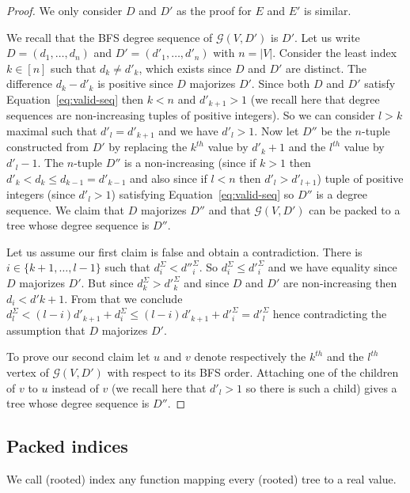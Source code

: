 \documentclass[11 pt]{modarticle}
\newcommand{\size}[1]{|#1|}
\newcommand{\greedy}[2]{\mathcal{G}(#1,#2)}
\begin{document}
\begin{proof}
We only consider $D$ and $D'$ as the proof for $E$ and $E'$ is similar.

We recall that the BFS degree sequence of $\greedy{V}{D'}$ is $D'$. Let us write $D = (d_1, \dots, d_n)$ and $D' = (d'_1, \dots, d'_n)$ with $n = \size{V}$. Consider the least index $k \in [n]$ such that $d_k \neq d'_k$, which exists since $D$ and $D'$ are distinct. The difference $d_k - d'_k$ is positive since $D$ majorizes $D'$. Since both $D$ and $D'$ satisfy Equation~\eqref{eq:valid-seq} then $k < n$ and $d'_{k+1} > 1$ (we recall here that degree sequences are non-increasing tuples of positive integers). So we can consider $l > k$ maximal such that $d'_l = d'_{k+1}$ and we have $d'_l > 1$. Now let $D''$ be the $n$-tuple constructed from $D'$ by replacing the $k^{th}$ value by $d'_k+1$ and the $l^{th}$ value by $d'_l-1$. The $n$-tuple $D''$ is a non-increasing (since if $k > 1$ then $d'_k < d_k \leq d_{k-1} = d'_{k-1}$ and also since if $l < n$ then $d'_l > d'_{l+1}$) tuple of positive integers (since $d'_l > 1$) satisfying Equation~\eqref{eq:valid-seq} so $D''$ is a degree sequence. We claim that $D$ majorizes $D''$ and that $\greedy{V}{D'}$ can be packed to a tree whose degree sequence is $D''$.

Let us assume our first claim is false and obtain a contradiction. There is $i \in \{k+1, \dots, l-1\}$ such that $d^{\Sigma}_i < d''^{\Sigma}_i$. So $d^{\Sigma}_i \leq d'^{\Sigma}_i$ and we have equality since $D$ majorizes $D'$. But since $d^{\Sigma}_k > d'^{\Sigma}_k$ and since $D$ and $D'$ are non-increasing then $d_i < d'{k+1}$.  From that we conclude $d^{\Sigma}_l < (l-i) d'_{k+1} + d^{\Sigma}_i \leq (l-i) d'_{k+1} + d'^{\Sigma}_i = d'^{\Sigma}_l$ hence contradicting the assumption that $D$ majorizes $D'$. 

To prove our second claim let $u$ and $v$ denote respectively the $k^{th}$ and the $l^{th}$ vertex of $\greedy{V}{D'}$ with respect to its BFS order. Attaching one of the children of $v$ to $u$ instead of $v$ (we recall here that $d'_l > 1$ so there is such a child) gives a tree whose degree sequence is $D''$.
\end{proof}

\subsection{Packed indices}

We call (rooted) index any function mapping every (rooted) tree to a real value.
\end{document}
